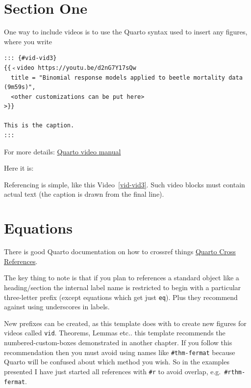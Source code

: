 \documentclass[
  a4paper,
  DIV=11,
  numbers=noendperiod,
  oneside]{scrreport}
\begin{document}
\section{Section One}\label{section-one}

One way to include videos is to use the Quarto syntax used to insert any
figures, where you write

\begin{verbatim}
::: {#vid-vid3}
{{﹤video https://youtu.be/d2nG7Y17sQw 
  title = "Binomial response models applied to beetle mortality data (9m59s)",
  <other customizations can be put here>
>}}

This is the caption.
:::
\end{verbatim}

For more details:
\href{https://quarto.org/docs/authoring/videos.html}{Quarto video
manual}

Here it is:

\begin{video}


\caption{\label{vid-vid3}This is the caption.}

\end{video}%

Referencing is simple, like this Video~\ref{vid-vid3}. Such video blocks
must contain actual text (the caption is drawn from the final line).

\section{Equations}\label{sec-equations}

There is good Quarto documentation on how to crossref things
\href{https://quarto.org/docs/authoring/cross-references.html}{Quarto
Cross References}.

The key thing to note is that if you plan to references a standard
object like a heading/section the internal label name is restricted to
begin with a particular three-letter prefix (except equations which get
just \texttt{eq}). Plus they recommend against using underscores in
labels.

New prefixes can be created, as this template does with to create new
figures for videos called \texttt{vid}. Theorems, Lemmas etc.. this
template recommends the numbered-custom-boxes demonstrated in another
chapter. If you follow this recommendation then you must avoid using
names like \texttt{\#thm-fermat} because Quarto will be confused about
which method you wish. So in the examples presented I have just started
all references with \texttt{\#r} to avoid overlap,
e.g.~\texttt{\#rthm-fermat}.
\end{document}

